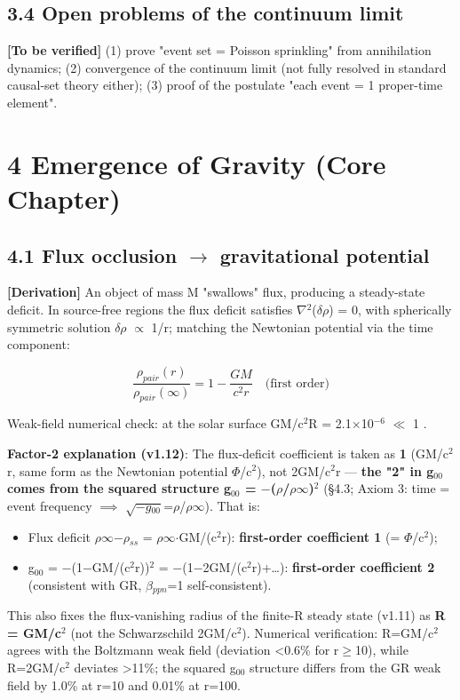 \documentclass[12pt]{article}
\newcommand{\mtag}[1]{\textbf{[#1]}}
\newcommand{\up}[1]{\ensuremath{^{#1}}}
\newcommand{\down}[1]{\ensuremath{_{#1}}}
\begin{document}
\subsection{3.4 Open problems of the continuum limit}

\mtag{To be verified} (1) prove "event set = Poisson sprinkling" from annihilation dynamics; (2) convergence of the continuum limit (not fully resolved in standard causal-set theory either); (3) proof of the postulate "each event = 1 proper-time element".


\section{4 Emergence of Gravity (Core Chapter)}

\subsection{4.1 Flux occlusion \ensuremath{\to} gravitational potential}

\mtag{Derivation} An object of mass M "swallows" flux, producing a steady-state deficit. In source-free regions the flux deficit satisfies \ensuremath{\nabla}\up{2}(\ensuremath{\delta}\ensuremath{\rho}) = 0, with spherically symmetric solution \ensuremath{\delta}\ensuremath{\rho} \ensuremath{\propto} 1/r; matching the Newtonian potential via the time component:

\[\frac{\rho_{pair}(r)}{\rho_{pair}(\infty)} = 1 - \frac{GM}{c^2 r} \quad\text{(first order)}\]

Weak-field numerical check: at the solar surface GM/c\up{2}R = 2.1\ensuremath{\times}10\up{-6} \ensuremath{\ll} 1 \checkmark.

\textbf{Factor-2 explanation (v1.12)}: The flux-deficit coefficient is taken as \textbf{1} (GM/c\up{2}r, same form as the Newtonian potential \ensuremath{\Phi}/c\up{2}), not 2GM/c\up{2}r --- \textbf{the "2" in g\down{00} comes from the squared structure g\down{00} = \ensuremath{-}(\ensuremath{\rho}/\ensuremath{\rho}\ensuremath{\infty})\up{2}} (\S{}4.3; Axiom 3: time = event frequency \ensuremath{\implies} \ensuremath{\sqrt{-g\down{00}}}=\ensuremath{\rho}/\ensuremath{\rho}\ensuremath{\infty}). That is:
\begin{itemize}
\item Flux deficit \ensuremath{\rho}\ensuremath{\infty}\ensuremath{-}\ensuremath{\rho}\down{ss} = \ensuremath{\rho}\ensuremath{\infty}\ensuremath{\cdot}GM/(c\up{2}r): \textbf{first-order coefficient 1} (= \ensuremath{\Phi}/c\up{2});
\item g\down{00} = \ensuremath{-}(1\ensuremath{-}GM/(c\up{2}r))\up{2} = \ensuremath{-}(1\ensuremath{-}2GM/(c\up{2}r)+\ldots): \textbf{first-order coefficient 2} (consistent with GR, \ensuremath{\beta}\down{ppn}=1 self-consistent).
\end{itemize}
This also fixes the flux-vanishing radius of the finite-R steady state (v1.11) as \textbf{R = GM/c\up{2}} (not the Schwarzschild 2GM/c\up{2}). Numerical verification: R=GM/c\up{2} agrees with the Boltzmann weak field (deviation <0.6\% for r\ensuremath{\geq}10), while R=2GM/c\up{2} deviates >11\%; the squared g\down{00} structure differs from the GR weak field by 1.0\% at r=10 and 0.01\% at r=100.
\end{document}
